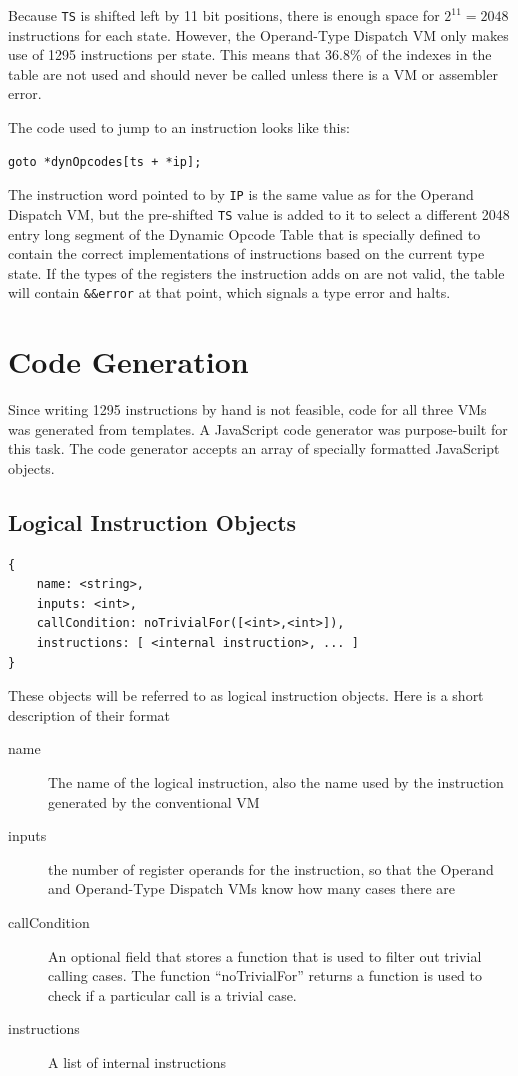\documentclass[english,a4paper,12pt]{report}
\begin{document}
Because \verb|TS| is shifted left by 11 bit positions, there is enough
space for $2^{11} = 2048$ instructions for each state. However, the
Operand-Type Dispatch VM only makes use of 1295 instructions per
state. This means that 36.8\% of the indexes in the table are not used
and should never be called unless there is a VM or assembler error.

The code used to jump to an instruction looks like this:
\begin{lstlisting}
goto *dynOpcodes[ts + *ip];
\end{lstlisting}

The instruction word pointed to by \verb|IP| is the same value as for
the Operand Dispatch VM, but the pre-shifted \verb|TS| value is added
to it to select a different 2048 entry long segment of the Dynamic
Opcode Table that is specially defined to contain the correct
implementations of instructions based on the current type state. If
the types of the registers the instruction adds on are not valid, the
table will contain \verb|&&error| at that point, which signals a type
error and halts.

\section{Code Generation}

Since writing 1295 instructions by hand is not feasible, code for all
three VMs was generated from templates. A JavaScript code generator
was purpose-built for this task. The code generator accepts an array
of specially formatted JavaScript objects.

\subsection{Logical Instruction Objects}

\begin{lstlisting}
{
    name: <string>,
    inputs: <int>,
    callCondition: noTrivialFor([<int>,<int>]),
    instructions: [ <internal instruction>, ... ]
}	
\end{lstlisting}
These objects will be referred to as logical instruction objects. Here
is a short description of their format
\begin{description}
\item[name] The name of the logical instruction, also the name used by
  the instruction generated by the conventional VM
\item[inputs] the number of register operands for the instruction, so
  that the Operand and Operand-Type Dispatch VMs know how many cases
  there are
\item[callCondition] An optional field that stores a function that is
  used to filter out trivial calling cases. The function
  ``noTrivialFor'' returns a function is used to check if a particular
  call is a trivial case.
	\item[instructions] A list of internal instructions	
\end{description}
\end{document}

